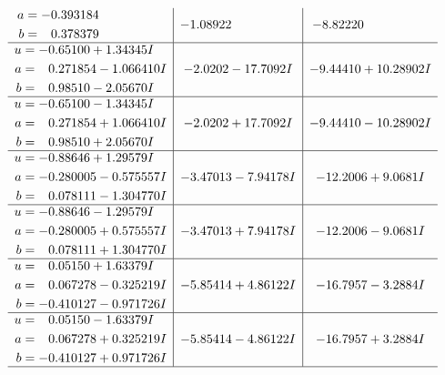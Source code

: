 \documentclass[1p]{elsarticle_modified}
\theoremstyle{definition}
\begin{document}
$$\begin{array}{c|c|c}
\begin{aligned}
a &= -0.393184\phantom{ +0.000000I} \\
b &= \phantom{-}0.378379\phantom{ +0.000000I}\end{aligned}
 & -1.08922\phantom{ +0.000000I} & -8.82220\phantom{ +0.000000I} \\ \hline\begin{aligned}
u &= -0.65100 + 1.34345 I \\
a &= \phantom{-}0.271854 - 1.066410 I \\
b &= \phantom{-}0.98510 - 2.05670 I\end{aligned}
 & -2.0202 - 17.7092 I & -9.44410 + 10.28902 I \\ \hline\begin{aligned}
u &= -0.65100 - 1.34345 I \\
a &= \phantom{-}0.271854 + 1.066410 I \\
b &= \phantom{-}0.98510 + 2.05670 I\end{aligned}
 & -2.0202 + 17.7092 I & -9.44410 - 10.28902 I \\ \hline\begin{aligned}
u &= -0.88646 + 1.29579 I \\
a &= -0.280005 - 0.575557 I \\
b &= \phantom{-}0.078111 - 1.304770 I\end{aligned}
 & -3.47013 - 7.94178 I & -12.2006 + 9.0681 I \\ \hline\begin{aligned}
u &= -0.88646 - 1.29579 I \\
a &= -0.280005 + 0.575557 I \\
b &= \phantom{-}0.078111 + 1.304770 I\end{aligned}
 & -3.47013 + 7.94178 I & -12.2006 - 9.0681 I \\ \hline\begin{aligned}
u &= \phantom{-}0.05150 + 1.63379 I \\
a &= \phantom{-}0.067278 - 0.325219 I \\
b &= -0.410127 - 0.971726 I\end{aligned}
 & -5.85414 + 4.86122 I & -16.7957 - 3.2884 I \\ \hline\begin{aligned}
u &= \phantom{-}0.05150 - 1.63379 I \\
a &= \phantom{-}0.067278 + 0.325219 I \\
b &= -0.410127 + 0.971726 I\end{aligned}
 & -5.85414 - 4.86122 I & -16.7957 + 3.2884 I\\
 \hline 
 \end{array}$$\newpage\newpage\renewcommand{\arraystretch}{1}
\end{document}
